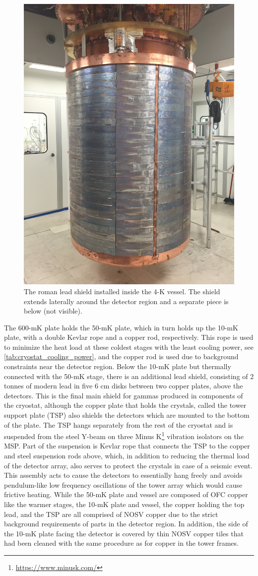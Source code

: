 \begin{figure}
    \centering
    \includegraphics[width=0.4\linewidth, height=0.4\pageheight, keepaspectratio]{Figures/roman_lead_shield.jpg}
    \caption[The roman lead shield installed inside the 4-K vessel.]
    {The roman lead shield installed inside the 4-K vessel. The shield extends laterally around the detector region and a separate piece is below (not visible).}
    \label{fig:roman_lead_shield}
\end{figure}
The 600-mK plate holds the 50-mK plate, which in turn holds up the 10-mK plate, with a double Kevlar rope and a copper rod, respectively.
This rope is used to minimize the heat load at these coldest stages with the least cooling power, see \autoref{tab:cryostat_cooling_power}, and the copper rod is used due to background constraints near the detector region.
Below the 10-mK plate but thermally connected with the 50-mK stage, there is an additional lead shield, consisting of 2 tonnes of modern lead in five 6 cm disks between two copper plates, above the detectors.
This is the final main shield for gammas produced in components of the cryostat, although the copper plate that holds the crystals, called the tower support plate (TSP) also shields the detectors which are mounted to the bottom of the plate.
The TSP hangs separately from the rest of the cryostat and is suspended from the steel Y-beam on three Minus K\footnote{\RaggedRight\url{https://www.minusk.com/}} vibration isolators on the MSP.
Part of the suspension is Kevlar rope that connects the TSP to the copper and steel suspension rods above, which, in addition to reducing the thermal load of the detector array, also serves to protect the crystals in case of a seismic event. 
This assembly acts to cause the detectors to essentially hang freely and avoids pendulum-like low frequency oscillations of the tower array which would cause frictive heating.
While the 50-mK plate and vessel are composed of OFC copper like the warmer stages, the 10-mK plate and vessel, the copper holding the top lead, and the TSP are all comprised of NOSV copper due to the strict background requirements of parts in the detector region.
In addition, the side of the 10-mK plate facing the detector is covered by thin NOSV copper tiles that had been cleaned with the same procedure as for copper in the tower frames.
    
